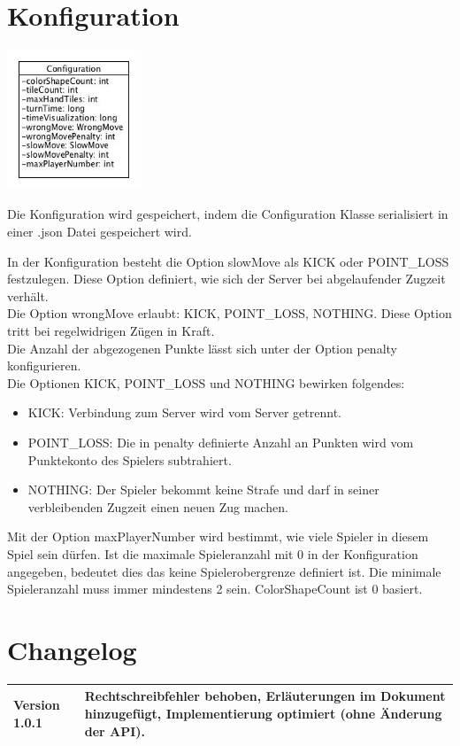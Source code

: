 \documentclass[a4paper, 10pt]{article}
\begin{document}
\newpage
\section{Konfiguration}
\label{sec:konfiguration}
\begin{center}
\includegraphics[width=4cm]{media/ClassConfiguration}
\end{center}
Die Konfiguration wird gespeichert, indem die Configuration Klasse serialisiert in einer .json Datei gespeichert wird. \par
In der Konfiguration besteht die Option slowMove als KICK oder POINT\_LOSS festzulegen. Diese Option definiert, wie sich der Server bei abgelaufender Zugzeit verhält. \\
Die Option wrongMove erlaubt: KICK, POINT\_LOSS, NOTHING. Diese Option tritt bei regelwidrigen Zügen in Kraft. \\
Die Anzahl der abgezogenen Punkte lässt sich unter der Option penalty konfigurieren. \\
Die Optionen KICK, POINT\_LOSS und NOTHING bewirken folgendes:
\begin{itemize}
	\item KICK: Verbindung zum Server wird vom Server getrennt.
	\item POINT\_LOSS: Die in penalty definierte Anzahl an Punkten wird vom Punktekonto des Spielers subtrahiert.
	\item NOTHING: Der Spieler bekommt keine Strafe und darf in seiner verbleibenden Zugzeit einen neuen Zug machen.
\end{itemize}
Mit der Option maxPlayerNumber wird bestimmt, wie viele Spieler in diesem Spiel sein dürfen. Ist die maximale Spieleranzahl mit 0 in der Konfiguration angegeben, bedeutet dies das keine Spielerobergrenze definiert ist. Die minimale Spieleranzahl muss immer mindestens 2 sein.
ColorShapeCount ist 0 basiert.

\section{Changelog}
\label{sec:changelog}
\begin{center}
	\begin{tabular}{| p{2cm} | p{12cm} |}
	\hline
		Version 1.0.1 & Rechtschreibfehler behoben, Erläuterungen im Dokument hinzugefügt, \newline
		Implementierung optimiert (ohne Änderung der API).\\
	\hline
	\end{tabular}

\end{center}
\end{document}
